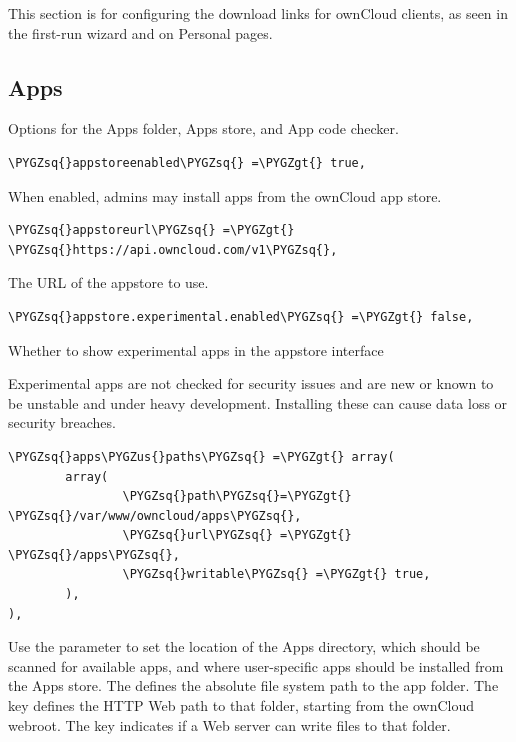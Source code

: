 \documentclass[letterpaper,10pt,english]{sphinxmanual}
\def\PYGZus{\char`\_}
\def\PYGZgt{\char`\>}
\def\PYGZsq{\char`\'}
\renewcommand\PYGZsq{\textquotesingle}
\begin{document}
This section is for configuring the download links for ownCloud clients, as
seen in the first-run wizard and on Personal pages.


\subsection{Apps}
\label{configuration_server/config_sample_php_parameters:apps}
Options for the Apps folder, Apps store, and App code checker.

\begin{Verbatim}[commandchars=\\\{\}]
\PYGZsq{}appstoreenabled\PYGZsq{} =\PYGZgt{} true,
\end{Verbatim}

When enabled, admins may install apps from the ownCloud app store.

\begin{Verbatim}[commandchars=\\\{\}]
\PYGZsq{}appstoreurl\PYGZsq{} =\PYGZgt{} \PYGZsq{}https://api.owncloud.com/v1\PYGZsq{},
\end{Verbatim}

The URL of the appstore to use.

\begin{Verbatim}[commandchars=\\\{\}]
\PYGZsq{}appstore.experimental.enabled\PYGZsq{} =\PYGZgt{} false,
\end{Verbatim}

Whether to show experimental apps in the appstore interface

Experimental apps are not checked for security issues and are new or known
to be unstable and under heavy development. Installing these can cause data
loss or security breaches.

\begin{Verbatim}[commandchars=\\\{\}]
\PYGZsq{}apps\PYGZus{}paths\PYGZsq{} =\PYGZgt{} array(
        array(
                \PYGZsq{}path\PYGZsq{}=\PYGZgt{} \PYGZsq{}/var/www/owncloud/apps\PYGZsq{},
                \PYGZsq{}url\PYGZsq{} =\PYGZgt{} \PYGZsq{}/apps\PYGZsq{},
                \PYGZsq{}writable\PYGZsq{} =\PYGZgt{} true,
        ),
),
\end{Verbatim}

Use the  parameter to set the location of the Apps directory,
which should be scanned for available apps, and where user-specific apps
should be installed from the Apps store. The  defines the absolute
file system path to the app folder. The key  defines the HTTP Web path
to that folder, starting from the ownCloud webroot. The key 
indicates if a Web server can write files to that folder.
\end{document}
